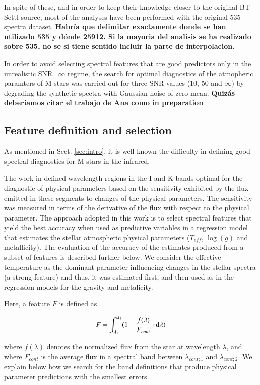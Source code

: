 {{{In spite of these, and in order to keep their knowledge closer to the
original BT-Settl source, most of the analyses have been performed
with the original 535 spectra dataset.  }{\bf Habría que delimitar
exactamente donde se han utilizado 535 y dónde 25912. Si la mayoria
del analisis se ha realizado sobre 535, no se si tiene sentido incluir
la parte de interpolacion.}


{ In order to avoid selecting spectral features that are good
  predictors only in the unrealistic SNR=$\infty$ regime, the search
  for optimal diagnostics of the atmopheric paramters of M stars was
  carried out for three SNR values (10, 50 and $\infty$) by degrading
  the synthetic spectra with Gaussian noise of zero mean.  {\bf Quizás
  deberíamos citar el trabajo de Ana como in preparation} }

\subsection{Feature definition and selection}
\label{subsec:FD}
{ As mentioned in Sect. \ref{sec:intro}, it is well known the
difficulty in defining good spectral diagnostics for M stars in the
infrared.}

{The work in \cite{2013A&A...549A.129C} defined wavelength regions in
the I and K bands optimal for the diagnostic of physical parameters
based on the sensitivity exhibited by the flux emitted in these
segments to changes of the physical parameters. The sensitivity was
measured in terms of the derivative of the flux with respect to the
physical parameter. The approach adopted in this work is to select
spectral features that yield the best accuracy when used as predictive
variables in a regression model that estimates the stellar atmospheric
physical parameters ($T_{eff}$, $\log(g)$ and metallicity). The
evaluation of the accuracy of the estimates produced from a subset of
features is described further below. We consider the effective
temperature as the dominant parameter influencing changes in the
stellar spectra (a strong feature) and thus, it was estimated first,
and then used as in the regression models for the gravity and
metalicity.}

Here, a feature $F$ is defined as

\begin{equation}\label{eq:feature}
  F = \int_{\lambda_{1}}^{\lambda_{2}} (1-\frac{f(\lambda)}{F_{cont}} \cdot {\rm d}{\lambda})
\end{equation}

where $f(\lambda)$ denotes the normalized flux from the star at
wavelength $\lambda$, and where $F_{cont}$ is the average flux in a
spectral band between $\lambda_{cont;1}$ and $\lambda_{cont;2}$. We
explain below how we search for the band definitions that produce
physical parameter predictions with the smallest errors.

}}
